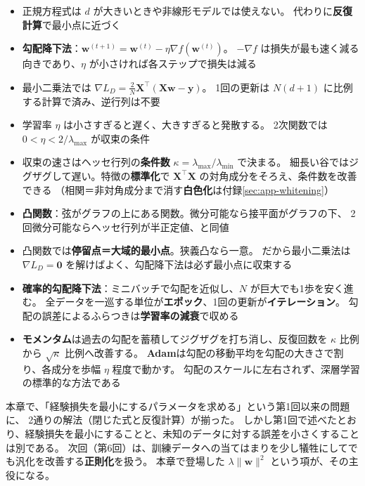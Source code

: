 \begin{itemize}
  \item 正規方程式は $d$ が大きいときや非線形モデルでは使えない。
    代わりに\textbf{反復計算}で最小点に近づく
  \item \textbf{勾配降下法}：$\bm{w}^{(t+1)} = \bm{w}^{(t)} - \eta\nabla f(\bm{w}^{(t)})$。
    $-\nabla f$ は損失が最も速く減る向きであり、$\eta$ が小さければ各ステップで損失は減る
  \item 最小二乗法では $\nabla L_D = \frac{2}{N}\bm{X}^\top(\bm{X}\bm{w} - \bm{y})$。
    1回の更新は $N(d+1)$ に比例する計算で済み、逆行列は不要
  \item 学習率 $\eta$ は小さすぎると遅く、大きすぎると発散する。
    2次関数では $0 < \eta < 2/\lambda_{\max}$ が収束の条件
  \item 収束の速さはヘッセ行列の\textbf{条件数} $\kappa = \lambda_{\max}/\lambda_{\min}$ で決まる。
    細長い谷ではジグザグして遅い。特徴の\textbf{標準化}で $\bm{X}^\top\bm{X}$ の対角成分をそろえ、条件数を改善できる
    （相関＝非対角成分まで消す\textbf{白色化}は付録\ref{sec:app-whitening}）
  \item \textbf{凸関数}：弦がグラフの上にある関数。微分可能なら接平面がグラフの下、
    2回微分可能ならヘッセ行列が半正定値、と同値
  \item 凸関数では\textbf{停留点＝大域的最小点}。狭義凸なら一意。
    だから最小二乗法は $\nabla L_D = \bm{0}$ を解けばよく、勾配降下法は必ず最小点に収束する
  \item \textbf{確率的勾配降下法}：ミニバッチで勾配を近似し、$N$ が巨大でも1歩を安く進む。
    全データを一巡する単位が\textbf{エポック}、1回の更新が\textbf{イテレーション}。
    勾配の誤差によるふらつきは\textbf{学習率の減衰}で収める
  \item \textbf{モメンタム}は過去の勾配を蓄積してジグザグを打ち消し、反復回数を $\kappa$ 比例から $\sqrt{\kappa}$ 比例へ改善する。
    \textbf{Adam}は勾配の移動平均を勾配の大きさで割り、各成分を歩幅 $\eta$ 程度で動かす。
    勾配のスケールに左右されず、深層学習の標準的な方法である
\end{itemize}

本章で、「経験損失を最小にするパラメータを求める」という第1回以来の問題に、
2通りの解法（閉じた式と反復計算）が揃った。
しかし第1回で述べたとおり、経験損失を最小にすることと、未知のデータに対する誤差を小さくすることは別である。
次回（第6回）は、訓練データへの当てはまりを少し犠牲にしてでも汎化を改善する\textbf{正則化}を扱う。
本章で登場した $\lambda\|\bm{w}\|^2$ という項が、その主役になる。


